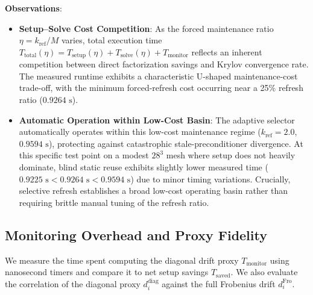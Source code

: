 \documentclass[preprint,12pt,3p]{elsarticle}
\begin{document}
\textbf{Observations}:
\begin{itemize}
    \item \textbf{Setup--Solve Cost Competition}: As the forced maintenance ratio $\eta = k_{\text{ref}}/M$ varies, total execution time $T_{\text{total}}(\eta) = T_{\text{setup}}(\eta) + T_{\text{solve}}(\eta) + T_{\text{monitor}}$ reflects an inherent competition between direct factorization savings and Krylov convergence rate. The measured runtime exhibits a characteristic U-shaped maintenance-cost trade-off, with the minimum forced-refresh cost occurring near a 25\% refresh ratio ($0.9264\text{ s}$).
    \item \textbf{Automatic Operation within Low-Cost Basin}: The adaptive selector automatically operates within this low-cost maintenance regime ($k_{\text{ref}} = 2.0$, $0.9594\text{ s}$), protecting against catastrophic stale-preconditioner divergence. At this specific test point on a modest $28^3$ mesh where setup does not heavily dominate, blind static reuse exhibits slightly lower measured time ($0.9225\text{ s} < 0.9264\text{ s} < 0.9594\text{ s}$) due to minor timing variations. Crucially, selective refresh establishes a broad low-cost operating basin rather than requiring brittle manual tuning of the refresh ratio.
\end{itemize}

\subsection{Monitoring Overhead and Proxy Fidelity}
\label{subsec:res_overhead}
We measure the time spent computing the diagonal drift proxy $T_{\text{monitor}}$ using nanosecond timers and compare it to net setup savings $T_{\text{saved}}$. We also evaluate the correlation of the diagonal proxy $d_i^{\text{diag}}$ against the full Frobenius drift $d_i^{\text{Fro}}$.

\begin{table}[htbp]
\centering
\small
\caption{Monitoring overhead fractions (setup-normalized $\eta_{\text{mon}}^{\text{setup}}$ and total-time-normalized $\eta_{\text{mon}}^{\text{total}}$) and correlation between diagonal drift proxy and Frobenius drift.}
\label{tab:pillar3_overhead}
\end{table}
\end{document}
